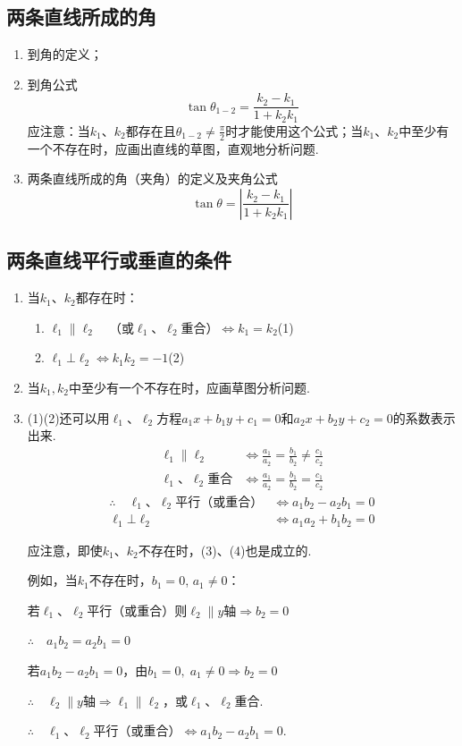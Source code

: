 \subsection{两条直线所成的角}
\begin{enumerate}
    \item 到角的定义；
    \item 到角公式
\[\tan\theta_{1-2}=\frac{k_2-k_1}{1+k_2k_1}\]
应注意：当$k_1$、$k_2$都存在且$\theta_{1-2}\ne \frac{\pi}{2}$时才能使用这个公式；当$k_1$、$k_2$中至少有一个不存在时，应画出直线的草图，直观地分析问题.
\item 两条直线所成的角（夹角）的定义及夹角公式
\[\tan\theta=\left|\frac{k_2-k_1}{1+k_2k_1}\right|\]
\end{enumerate}

\subsection{两条直线平行或垂直的条件}
\begin{enumerate}
    \item 当$k_1$、$k_2$都存在时：
\begin{enumerate}[(1)]
    \item $\ell_1\parallel \ell_2\quad \text{（或$\ell_1$、$\ell_2$重合）} \Longleftrightarrow k_1=k_2$\hfill(1)
\item $\ell_1\bot \ell_2  \Longleftrightarrow k_1k_2=-1$\hfill(2)
\end{enumerate}
\item 当$k_1,k_2$中至少有一个不存在时，应画草图分析问题.
\item (1)(2)还可以用$\ell_1$、$\ell_2$方程$a_1x+b_1y+c_1=0$和$a_2x+b_2y+c_2=0$的系数表示出来.
\[\begin{split}
    \ell_1\parallel \ell_2 &\Longleftrightarrow \frac{a_1}{a_2}=\frac{b_1}{b_2}\ne \frac{c_1}{c_2}\\
    \text{$\ell_1$、$\ell_2$重合} &\Longleftrightarrow \frac{a_1}{a_2}=\frac{b_1}{b_2}= \frac{c_1}{c_2}
\end{split}\]
\begin{align}
    \therefore\quad \text{$\ell_1$、$\ell_2$平行（或重合）} &\Longleftrightarrow  a_1b_2-a_2b_1=0 \tag{1}\\
    \ell_1\bot \ell_2  &\Longleftrightarrow a_1a_2+b_1b_2=0\tag{2}
\end{align}

应注意，即使$k_1$、$k_2$不存在时，(3)、(4)也是成立的.

例如，当$k_1$不存在时，$b_1=0$, $a_1\ne 0$：

若$\ell_1$、$\ell_2$平行（或重合）则$\ell_2\parallel y$轴$\Rightarrow b_2=0$
    
    $\therefore\quad a_1b_2=a_2b_1=0$

若$a_1b_2-a_2b_1=0$，由$b_1=0,\; a_1\ne 0\Rightarrow b_2=0$
    
$\therefore\quad \ell_2\parallel y$轴$\Rightarrow \ell_1\parallel \ell_2$，或$\ell_1$、$\ell_2$重合.

$\therefore\quad \ell_1$、$\ell_2$平行（或重合）$\Longleftrightarrow a_1b_2-a_2b_1=0$.
\end{enumerate}


